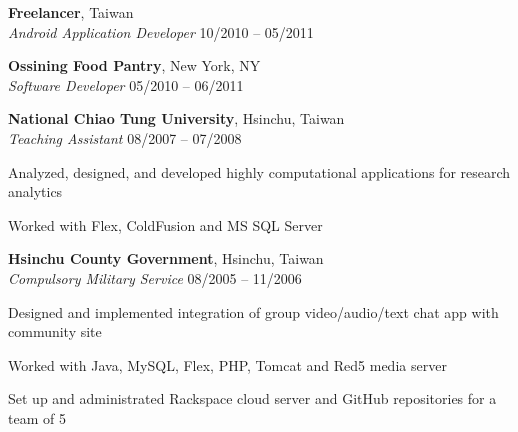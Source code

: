 \documentclass[margin,line]{resume}
\begin{document}
\begin{resume}
    \textbf{Freelancer}, Taiwan \\
    \textsl{Android Application Developer} \hfill 10/2010 -- 05/2011 \vspace{-3mm}\\\vspace{-1mm}%
      \begin{list2}
      \item 
      \item 
      \end{list2}

    \textbf{Ossining Food Pantry}, New York, NY \\
    \textsl{Software Developer} \hfill 05/2010 -- 06/2011 \vspace{-3mm}\\\vspace{-1mm}%
      \begin{list2}
      \item 
      \item 
      \end{list2}
    
    \textbf{National Chiao Tung University}, Hsinchu, Taiwan \\
    \textsl{Teaching Assistant} \hfill 08/2007 -- 07/2008 \vspace{-3mm}\\\vspace{-1mm}%
      \begin{list2}
      \item Analyzed, designed, and developed highly computational applications for research analytics
      \item Worked with Flex, ColdFusion and MS SQL Server
      \end{list2}

    \textbf{Hsinchu County Government}, Hsinchu, Taiwan \\
    \textsl{Compulsory Military Service} \hfill 08/2005 -- 11/2006 \vspace{-3mm}\\\vspace{-1mm}%
      \begin{list2}
      \item Designed and implemented integration of group video/audio/text chat app with community site
      \item Worked with Java, MySQL, Flex, PHP, Tomcat and Red5 media server	    
      \item Set up and administrated Rackspace cloud server and GitHub repositories for a team of 5
      \end{list2}


\end{resume}
\end{document}
